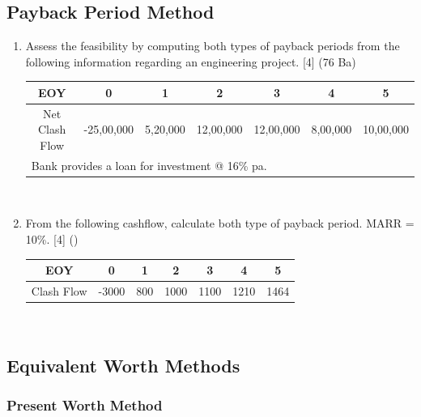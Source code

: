 \documentclass[12pt]{article}
\begin{document}
	\subsection{Payback Period Method}
	\begin{enumerate}[noitemsep, topsep = 0pt]
		\item Assess the feasibility by computing both types of payback periods from the following information regarding an engineering project. \hfill [4] (76 Ba)\\
		\begin{tabular}{|c|c|c|c|c|c|c|}
			\hline
			EOY & 0 & 1 & 2 & 3 & 4 & 5\\ \hline
			Net Clash Flow & -25,00,000 & 5,20,000 & 12,00,000 & 12,00,000 & 8,00,000 & 10,00,000\\ \hline
			\multicolumn{7}{|l|}{Bank provides a loan for investment @ 16\% pa.}\\ \hline
		\end{tabular}\\[0pt]

		\item From the following cashflow, calculate both type of payback period. MARR = 10\%. \hfill [4] ()
		\begin{tabular}{|c|c|c|c|c|c|c|}
			\hline
			EOY & 0 & 1 & 2 & 3 & 4 & 5\\ \hline
			Clash Flow & -3000 & 800 & 1000 & 1100 & 1210 & 1464\\ 
			\hline
		\end{tabular}\\[0pt]
	\end{enumerate}

	\subsection{Equivalent Worth Methods}
	\subsubsection{Present Worth Method}
\end{document}
